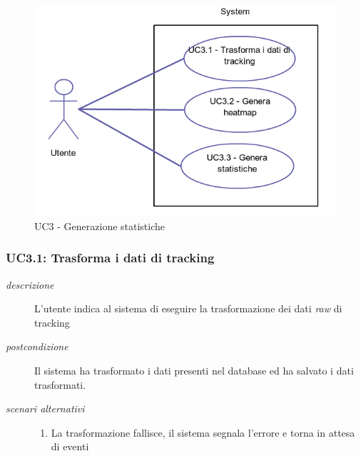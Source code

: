 \begin{figure}[htpb] 

\centering 

\includegraphics[scale=0.4]{./images/uc3.png} 

\caption{UC3 - Generazione statistiche} 

\label{fig:uc3}

\end{figure} 

\subsubsection{UC3.1: Trasforma i dati di tracking} \label{sec:UC3.1}
\begin{description}
\item[\em{descrizione }]L'utente indica al sistema di eseguire la trasformazione dei dati \textit{raw} di tracking
\item[\em{postcondizione }] Il sistema ha trasformato i dati presenti nel database ed ha salvato i dati trasformati.
\item[\em{scenari alternativi }] \mbox{}

  \begin{enumerate}
\item La trasformazione fallisce, il sistema segnala l'errore e torna in attesa di eventi
\end{enumerate}
\end{description}

